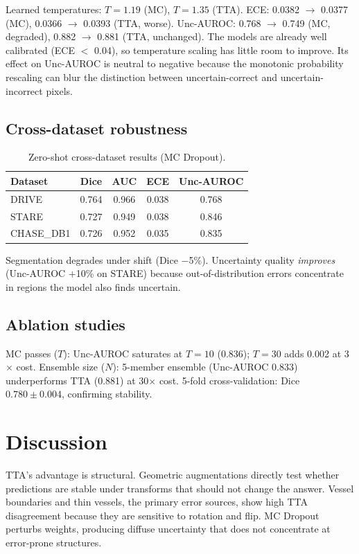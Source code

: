 \documentclass[review,3p]{elsarticle}
\begin{document}
Learned temperatures: $T = 1.19$ (MC), $T = 1.35$ (TTA). ECE: 0.0382 $\to$
0.0377 (MC), 0.0366 $\to$ 0.0393 (TTA, worse). Unc-AUROC: 0.768 $\to$ 0.749
(MC, degraded), 0.882 $\to$ 0.881 (TTA, unchanged). The models are already
well calibrated (ECE $<$ 0.04), so temperature scaling has little room to
improve. Its effect on Unc-AUROC is neutral to negative because the monotonic
probability rescaling can blur the distinction between uncertain-correct and
uncertain-incorrect pixels.

\subsection{Cross-dataset robustness}

\begin{table}[t]
\centering
\caption{Zero-shot cross-dataset results (MC Dropout).}
\begin{tabular}{lcccc}
\toprule
Dataset & Dice & AUC & ECE & Unc-AUROC \\
\midrule
DRIVE & 0.764 & 0.966 & 0.038 & 0.768 \\
STARE & 0.727 & 0.949 & 0.038 & 0.846 \\
CHASE\_DB1 & 0.726 & 0.952 & 0.035 & 0.835 \\
\bottomrule
\end{tabular}
\end{table}

Segmentation degrades under shift (Dice $-$5\%). Uncertainty quality
\emph{improves} (Unc-AUROC $+$10\% on STARE) because out-of-distribution
errors concentrate in regions the model also finds uncertain.

\subsection{Ablation studies}

MC passes ($T$): Unc-AUROC saturates at $T = 10$ (0.836); $T = 30$ adds 0.002
at 3$\times$ cost. Ensemble size ($N$): 5-member ensemble (Unc-AUROC 0.833)
underperforms TTA (0.881) at 30$\times$ cost. 5-fold cross-validation: Dice
$0.780 \pm 0.004$, confirming stability.

\section{Discussion}

TTA's advantage is structural. Geometric augmentations directly test whether
predictions are stable under transforms that should not change the answer.
Vessel boundaries and thin vessels, the primary error sources, show high TTA
disagreement because they are sensitive to rotation and flip. MC Dropout
perturbs weights, producing diffuse uncertainty that does not concentrate
at error-prone structures.
\end{document}
